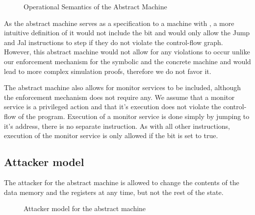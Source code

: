 \begin{figure}[htpb]
\bigskip

\caption{Operational Semantics of the Abstract Machine}
\label{abs_semantics}
\end{figure}

As the abstract machine serves as a specification to a machine with
\CFI, a more intuitive definition of it would not include the \ok bit
and would only allow the Jump and Jal instructions to step if they do
not violate the control-flow graph. However, this abstract machine
would not allow for any violations to occur unlike our enforcement
mechanism for the symbolic and the concrete machine and would lead to
more complex simulation proofs, therefore we do not favor it.

The abstract machine also allows for monitor services to be included,
although the \CFI enforcement mechanism does not require any. We
assume that a monitor service is a privileged action and that it's
execution does not violate the control-flow of the program. Execution
of a monitor service is done simply by jumping to it's address, there
is no separate instruction. As with all other instructions, execution
of the monitor service is only allowed if the \ok bit is set to true.

\subsection{Attacker model}\label{sec:abstract_attacker}

The attacker for the abstract machine is allowed to change the
contents of the data memory and the registers at any time,
but not the rest of the state.

\begin{figure}[ht]
\caption{Attacker model for the abstract machine}
\end{figure}

